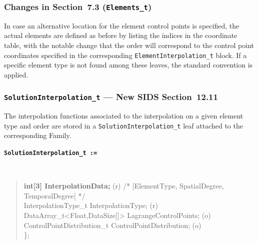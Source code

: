 \documentclass[11pt,letterpaper]{article}
\newenvironment{v2quote}
  {\begin{v2quoteframe}%
   \noindent{\footnotesize\sffamily\bfseries\color{cgnsblue}v2 text}%
   \nopagebreak\par\nopagebreak\vspace{0.15em}}
  {\end{v2quoteframe}}
\newenvironment{sidsnode}[1]{%
  \par\vspace{0.8em}%
  \noindent\colorbox{cgnslight!50}{\parbox{\dimexpr\linewidth-2\fboxsep}{%
    \raggedright\texttt{\textbf{\color{cgnsblue}#1}}}}\\[0.3em]%
  \begin{quote}\ttfamily
}{%
  \end{quote}\vspace{0.4em}%
}
\begin{document}
\subsubsection{Changes in Section~7.3 (\texttt{Elements\_t})}

\begin{v2quote}
In case an alternative location for the element control points is specified, the actual elements
are defined as before by listing the indices in the coordinate table, with the notable change that
the order will correspond to the control point coordinates specified in the corresponding
\texttt{ElementInterpolation\_t} block.  If a specific element type is not found among these
leaves, the standard convention is applied.
\end{v2quote}

\subsubsection{\texttt{SolutionInterpolation\_t} --- New SIDS Section~12.11}
\label{sec:solution-interpolation}

\begin{v2quote}
The interpolation functions associated to the interpolation on a given element type and order
are stored in a \texttt{SolutionInterpolation\_t} leaf attached to the corresponding Family.
\end{v2quote}

\begin{sidsnode}{SolutionInterpolation\_t :=}
\textbf{int[3] InterpolationData;}                       \textrm{(r)} \quad\textrm{/* [ElementType, SpatialDegree, TemporalDegree] */}\\
InterpolationType\_t InterpolationType;                  \textrm{(r)}\\
DataArray\_t<Float,DataSize[]> LagrangeControlPoints;    \textrm{(o)}\\
ControlPointDistribution\_t ControlPointDistribution; \textrm{(o)}\\
\};
\end{sidsnode}
\end{document}
